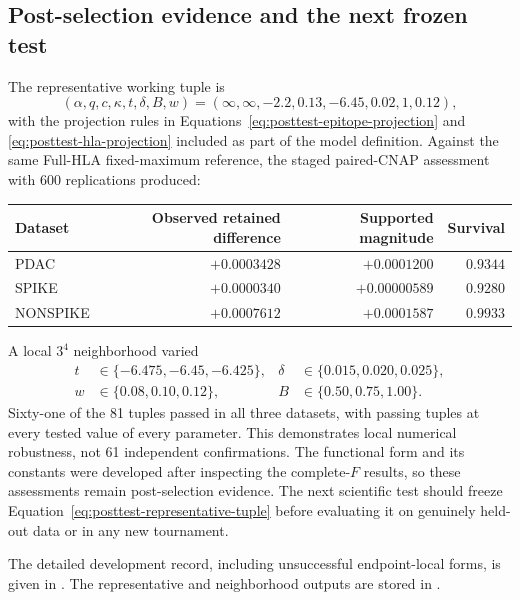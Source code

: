 \documentclass[11pt]{article}
\begin{document}
\subsection{Post-selection evidence and the next frozen test}

The representative working tuple is
\begin{equation}
(\alpha,q,c,\kappa,t,\delta,B,w)
=(\infty,\infty,-2.2,0.13,-6.45,0.02,1,0.12),
\label{eq:posttest-representative-tuple}
\end{equation}
with the projection rules in
Equations~\eqref{eq:posttest-epitope-projection} and
\eqref{eq:posttest-hla-projection} included as part of the model definition.
Against the same Full-HLA fixed-maximum reference, the staged paired-CNAP
assessment with 600 replications produced:

\begin{center}
\small
\begin{tabular}{@{}lrrr@{}}
\toprule
Dataset & Observed retained difference & Supported magnitude & Survival \\
\midrule
PDAC      & $+0.0003428$ & $+0.0001200$  & $0.9344$ \\
SPIKE     & $+0.0000340$ & $+0.00000589$ & $0.9280$ \\
NONSPIKE  & $+0.0007612$ & $+0.0001587$  & $0.9933$ \\
\bottomrule
\end{tabular}
\end{center}

A local $3^4$ neighborhood varied
\begin{align*}
t&\in\{-6.475,-6.45,-6.425\},
&\delta&\in\{0.015,0.020,0.025\},\\
w&\in\{0.08,0.10,0.12\},
&B&\in\{0.50,0.75,1.00\}.
\end{align*}
Sixty-one of the 81 tuples passed in all three datasets, with passing tuples
at every tested value of every parameter. This demonstrates local numerical
robustness, not 61 independent confirmations. The functional form and its
constants were developed after inspecting the complete-$F$ results, so these
assessments remain post-selection evidence. The next scientific test should
freeze Equation~\eqref{eq:posttest-representative-tuple} before evaluating it
on genuinely held-out data or in any new tournament.

The detailed development record, including unsuccessful endpoint-local forms,
is given in
.
The representative and neighborhood outputs are stored in
.
\end{document}
